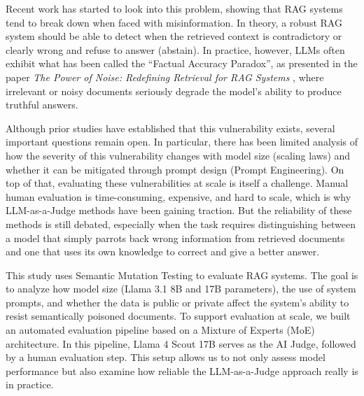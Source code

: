 \documentclass[
    a4paper,
    man,
    floatsintext
]{glossaPX2}
\newcommand{\parencite}[1]{\cite{#1}}
\begin{document}
Recent work has started to look into this problem, showing that RAG systems tend to break down when faced with misinformation. In theory, a robust RAG system should be able to detect when the retrieved context is contradictory or clearly wrong and refuse to answer (abstain). In practice, however, LLMs often exhibit what has been called the ``Factual Accuracy Paradox'', as presented in the paper \textit{The Power of Noise: Redefining Retrieval for RAG Systems} \parencite{cuconasu2024power}, where irrelevant or noisy documents seriously degrade the model's ability to produce truthful answers.

Although prior studies have established that this vulnerability exists, several important questions remain open. In particular, there has been limited analysis of how the severity of this vulnerability changes with model size (scaling laws) and whether it can be mitigated through prompt design (Prompt Engineering). On top of that, evaluating these vulnerabilities at scale is itself a challenge. Manual human evaluation is time-consuming, expensive, and hard to scale, which is why LLM-as-a-Judge methods have been gaining traction. But the reliability of these methods is still debated, especially when the task requires distinguishing between a model that simply parrots back wrong information from retrieved documents and one that uses its own knowledge to correct and give a better answer.

This study uses Semantic Mutation Testing to evaluate RAG systems. The goal is to analyze how model size (Llama 3.1 8B and 17B parameters), the use of system prompts, and whether the data is public or private affect the system's ability to resist semantically poisoned documents. To support evaluation at scale, we built an automated evaluation pipeline based on a Mixture of Experts (MoE) architecture. In this pipeline, Llama 4 Scout 17B serves as the AI Judge, followed by a human evaluation step. This setup allows us to not only assess model performance but also examine how reliable the LLM-as-a-Judge approach really is in practice.
\end{document}
